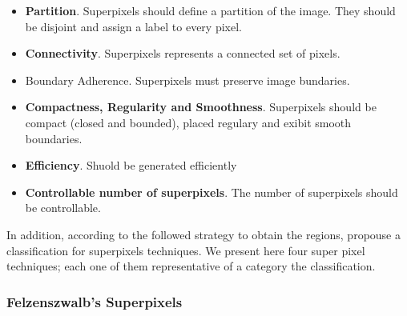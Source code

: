 \begin{itemize}
 \item \textbf{Partition}. Superpixels should define a partition of the image. They should be disjoint and assign a label to every pixel.
 \item \textbf{Connectivity}. Superpixels represents a connected set of pixels.
 \item Boundary Adherence. Superpixels must preserve image bundaries.
 \item \textbf{Compactness, Regularity and Smoothness}. Superpixels should be compact (closed and bounded), placed regulary and exibit smooth boundaries.
 \item \textbf{Efficiency}. Shuold be generated efficiently
 \item \textbf{Controllable number of superpixels}. The number of superpixels should be controllable.
\end{itemize}

In addition, according to the followed strategy to obtain the regions, \cite{Stutz.Hermans.ea:CVIU:2018} propouse a classification for superpixels techniques. We present here four super pixel techniques; each one of them representative of a category the classification. 




\subsubsection{Felzenszwalb's Superpixels}

